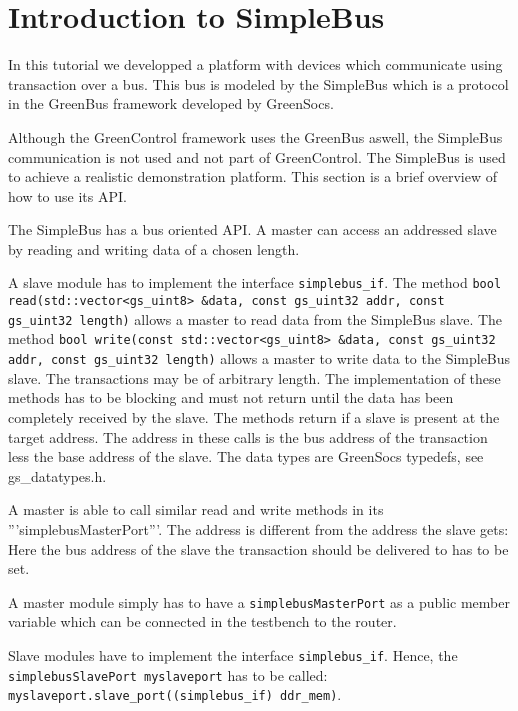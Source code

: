 
\section{Introduction to SimpleBus}
\label{IntroductionSimpleBus}

In this tutorial we developped a platform with devices which
communicate using transaction over a bus. This bus is modeled by the
SimpleBus which is a protocol in the GreenBus framework developed by
GreenSocs.

Although the GreenControl framework uses the GreenBus aswell, the SimpleBus communication is not used and not part of GreenControl. The SimpleBus is used to achieve a realistic demonstration platform. This section is a brief overview of how to use its API.

The SimpleBus has a bus oriented API. A master can access an addressed slave by reading and writing data of a chosen length.

A slave module has to implement the interface \lstinline|simplebus_if|. The method \lstinline|bool read(std::vector<gs_uint8> &data, const gs_uint32 addr, const gs_uint32 length)| allows a master to read data from the SimpleBus slave. The method \lstinline|bool write(const std::vector<gs_uint8> &data, const gs_uint32 addr, const gs_uint32 length)| allows a master to write data to the SimpleBus slave. The transactions may be of arbitrary length. The implementation of these methods has to be blocking and must not return until the data has been completely received by the slave. The methods return if a slave is present at the target address. The address in these calls is the bus address of the transaction less the base address of the slave. The data types are GreenSocs typedefs, see gs\_datatypes.h.

A master is able to call similar read and write methods in its '''simplebusMasterPort'''. The address is different from the address the slave gets: Here the bus address of the slave the transaction should be delivered to has to be set.

A master module simply has to have a \lstinline|simplebusMasterPort|
as a public member variable which can be connected in the testbench to the router.

Slave modules have to implement the interface
\lstinline|simplebus_if|. Hence, the \lstinline|simplebusSlavePort myslaveport| has to be called: \lstinline|myslaveport.slave_port((simplebus_if) ddr_mem)|. 

